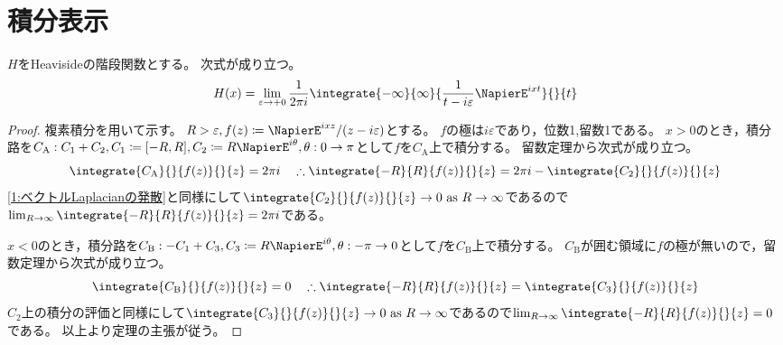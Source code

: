         \section{積分表示}
            \begin{shadebox}
                $H$をHeavisideの階段関数とする。
                次式が成り立つ。
                \[ H(x) = \lim_{\varepsilon\to +0}\frac{1}{2\pi i}\integrate{-\infty}{\infty}{\frac{1}{t-i\varepsilon}\NapierE^{ixt}}{}{t} \]
            \end{shadebox}
            \begin{proof}
                複素積分を用いて示す。
                $R>\varepsilon,f(z) \coloneq \NapierE^{ixz}/(z-i\varepsilon)$とする。
                $f$の極は$i\varepsilon$であり，位数1,留数1である。
                $x>0$のとき，積分路を$C_\mathrm{A}: C_1 + C_2,C_1 \coloneq [-R,R],C_2 \coloneq R\NapierE^{i\theta},\theta:0\to\pi$として$f$を$C_\mathrm{A}$上で積分する。
                留数定理から次式が成り立つ。
                \[ \integrate{C_\mathrm{A}}{}{f(z)}{}{z} = 2\pi i \quad \therefore \integrate{-R}{R}{f(z)}{}{z} = 2\pi i - \integrate{C_2}{}{f(z)}{}{z} \]
                \cite{数学備忘録} \ref{1:ベクトルLaplacianの発散}と同様にして$\integrate{C_2}{}{f(z)}{}{z} \to 0 \text{ as }R\to\infty$であるので$\lim_{R\to\infty}\integrate{-R}{R}{f(z)}{}{z} = 2\pi i$である。
                \par
                $x<0$のとき，積分路を$C_\mathrm{B}: -C_1 + C_3,C_3 \coloneq R\NapierE^{i\theta},\theta:-\pi\to 0$として$f$を$C_\mathrm{B}$上で積分する。
                $C_\mathrm{B}$が囲む領域に$f$の極が無いので，留数定理から次式が成り立つ。
                \[ \integrate{C_\mathrm{B}}{}{f(z)}{}{z} = 0 \quad \therefore \integrate{-R}{R}{f(z)}{}{z} = \integrate{C_3}{}{f(z)}{}{z} \]
                $C_2$上の積分の評価と同様にして$\integrate{C_3}{}{f(z)}{}{z} \to 0 \text{ as }R\to\infty$であるので$\lim_{R\to\infty}\integrate{-R}{R}{f(z)}{}{z} = 0$である。
                以上より定理の主張が従う。
            \end{proof}

